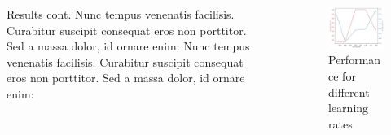 \documentclass[final]{beamer}
\newlength{\sepwid}
\newlength{\onecolwid}
\newlength{\twocolwid}
\begin{document}
\begin{frame}[t]
\begin{columns}[t]
\begin{column}{\twocolwid}
\begin{columns}[t,totalwidth=\twocolwid]
\begin{column}{\onecolwid}
\begin{block}{Results cont.}
Nunc tempus venenatis facilisis. Curabitur suscipit consequat eros non porttitor. Sed a massa dolor, id ornare enim:
Nunc tempus venenatis facilisis. Curabitur suscipit consequat eros non porttitor. Sed a massa dolor, id ornare enim:

\end{block}


\end{column} %

\end{columns} %

\end{column} %

\begin{column}{\sepwid}\end{column} %

\begin{column}{\onecolwid} %


\begin{figure}
    \includegraphics[width=0.8\linewidth]{learning_rate}
        \caption{Performance for different learning rates} 
        \label{fig:lrate}
\end{figure}


\end{column}
\end{columns}
\end{frame}
\end{document}
